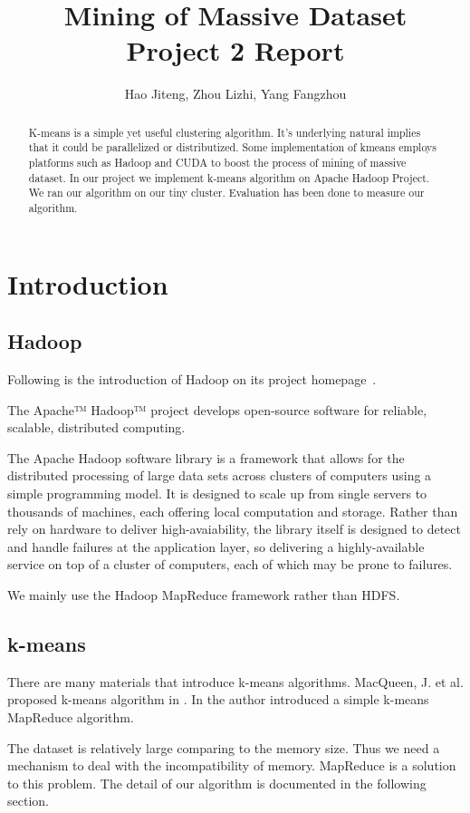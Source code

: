 \documentclass[a4paper,11pt]{article}
\title{
Mining of Massive Dataset\\
Project 2 Report
}
\author{Hao Jiteng, Zhou Lizhi, Yang Fangzhou}
\begin{document}
\maketitle

\begin{abstract}
K-means is a simple yet useful clustering algorithm. It's underlying natural
implies that it could be parallelized or distributized. Some implementation of
kmeans employs platforms such as Hadoop and CUDA to boost the process of mining
of massive dataset.
In our project we implement k-means algorithm on Apache Hadoop Project. We ran
our algorithm on our tiny cluster. Evaluation has been done to measure our
algorithm.
\end{abstract}

\section{Introduction}
\subsection{Hadoop}
Following is the introduction of Hadoop on its project
homepage~\cite{apache:hadoop}.

The Apache™ Hadoop™ project develops open-source software for reliable,
scalable, distributed computing.

The Apache Hadoop software library is a framework that allows for the
distributed processing of large data sets across clusters of computers using a
simple programming model. It is designed to scale up from single servers to
thousands of machines, each offering local computation and storage. Rather than
rely on hardware to deliver high-avaiability, the library itself is designed to
detect and handle failures at the application layer, so delivering a
highly-available service on top of a cluster of computers, each of which may
be prone to failures.

We mainly use the Hadoop MapReduce framework rather than HDFS.

\subsection{k-means}
There are many materials that introduce k-means
algorithms. MacQueen, J. et al. proposed k-means algorithm in
\cite{algo:kmeans1}. In \cite{algo:kmeans2} the author introduced a simple
k-means MapReduce algorithm. 

The dataset is relatively large comparing to the memory size. Thus we need a
mechanism to deal with the incompatibility of memory. MapReduce is a solution to
this problem. The detail of our algorithm is documented in the following
section.
\end{document}
